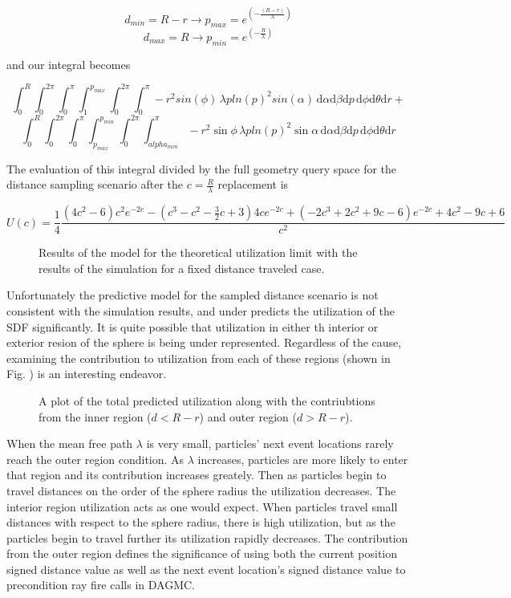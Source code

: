 $$ d_{min} = R-r \rightarrow p_{max} = e^{(-\frac{(R-r)}{\lambda})} $$
$$ d_{max} = R   \rightarrow p_{min} = e^{(-\frac{R}{\lambda})} $$

and our integral becomes

$$ \int_{0}^{R}\int_{0}^{2\pi}\int_{0}^{\pi}\int_{1}^{p_{max}}\int_{0}^{2\pi}\int_{0}^{\pi}
-r^2sin(\phi) \, \lambda p ln(p)^2 sin(\alpha) \, \mathrm{d}\alpha \mathrm{d}\beta \mathrm{d}p \, \mathrm{d}\phi
\mathrm{d}\theta \mathrm{d}r + $$
$$ \int_{0}^{R}\int_{0}^{2\pi}\int_{0}^{\pi}\int_{p_{max}}^{p_{min}}\int_{0}^{2\pi}\int_{alpha_{min}}^{\pi}
-r^2\sin{\phi} \, \lambda p ln(p)^2 \sin{\alpha} \, \mathrm{d}\alpha \mathrm{d}\beta \mathrm{d}p \, \mathrm{d}\phi
\mathrm{d}\theta \mathrm{d}r $$

The evaluation of this integral divided by the full geometry query space for the
distance sampling scenario after the $c=\frac{R}{\lambda}$ replacement is

$$U(c) = \frac{1}{4}\frac{(4 c^2-6) c^2e^{-2c} - (c^3-c^2-\frac{3}{2}
c+3)4ce^{-2c}+(-2 c^3+2c^2+9c-6) e^{-2c}+4c^2-9 c+6}{c^2}$$

\begin{figure}[ht] \label{fig:sdf_sampled_dist}
\centering
{\textwidth}
\caption{Results of the model for the theoretical utilization limit with the
results of the simulation for a fixed distance traveled case.}
\end{figure}

Unfortunately the predictive model for the sampled distance scenario is not
consistent with the simulation results, and under predicts the utilization of
the SDF significantly. It is quite possible that utilization in either th interior or exterior
resion of the sphere is being under represented. Regardless of the cause, examining the contribution to
utilization from each of these regions (shown in
Fig. \label{fig:util_region_contributions}) is an interesting endeavor.


\begin{figure}[ht] \label{fig:util_region_contributions}
\centering
{\textwidth}
\caption{A plot of the total predicted utilization along with the contriubtions
from the inner region ($d < R-r$) and outer region ($d > R-r$).}
\end{figure}

When the mean free path $\lambda$ is very small, particles' next event locations
rarely reach the outer region condition. As $\lambda$ increases, particles are
more likely to enter that region and its contribution increases greately. Then
as particles begin to travel distances on the order of the sphere radius the
utilization decreases. The interior region utilization acts as one would
expect. When particles travel small distances with respect to the sphere radius,
there is high utilization, but as the particles begin to travel further its
utilization rapidly decreases. The contribution from the outer region defines the
significance of using both the current position signed distance value as well as the
next event location's signed distance value to precondition ray fire calls in DAGMC.
